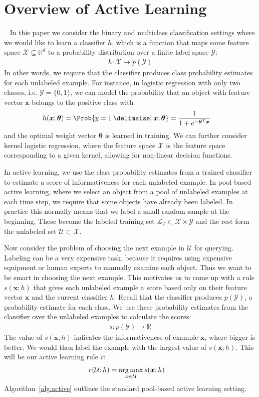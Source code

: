 \documentclass[fleqn,10pt,lineno]{wlpeerj} %
\newcommand{\X}{\mathcal{X}}
\newcommand{\Y}{\mathcal{Y}}
\newcommand{\Unlabeled}{\mathcal{U}}
\newcommand{\Labeled}{\mathcal{L}}
\newcommand*{\argmax}{\operatornamewithlimits{arg\,max}\limits}
\providecommand\given{}
\renewcommand\given{  \nonscript\:
		\delimsize\vert
		\nonscript\:
		\mathopen{}
		\allowbreak}
\renewcommand\given{  \nonscript\:
		\delimsize\vert
		\nonscript\:
		\mathopen{}
		\allowbreak}
\begin{document}
\section{Overview of Active Learning}~\label{sec:heuristics}
In this paper we consider the binary and multiclass classification settings
where we would like to learn a classifier $h$, which is a function that maps
some feature space $\X \subseteq \mathbb{R}^d$ to a probability distribution
over a finite label space $\Y$:
\begin{align}
	h : \X \rightarrow p(\Y)
\end{align}
In other words, we require that the classifier produces class probability
estimates for each unlabeled example. For instance, in logistic regression with
only two classes, i.e. $\Y = \{0, 1\}$, we can model the probability that an
object with feature vector $\bm{x}$ belongs to the positive class with
\begin{align}
	h(\bm{x}; \bm{\theta}) &= \Prob{y=1 \given \bm{x}; \bm{\theta}}
	= \dfrac{1}{1 + e^{-\bm{\theta}^T \bm{x}}}
\end{align}
and the optimal weight vector $\bm{\theta}$ is learned in training. We can
further consider kernel logistic regression, where the feature space $\X$ is
the feature space corresponding to a given kernel, allowing for non-linear
decision functions.

In active learning, we use the class probability estimates from a trained
classifier to estimate a score of informativeness for each unlabeled example.
In pool-based active learning, where we select an object from a pool of
unlabeled examples at each time step, we require that some objects have already
been labeled. In practice this normally means that we label a small random
sample at the beginning. These become the labeled training set $\Labeled_T
\subset \X \times \Y$ and the rest form the unlabeled set $\Unlabeled \subset
\X$.

Now consider the problem of choosing the next example in $\Unlabeled$ for
querying. Labeling can be a very expensive task, because it requires using
expensive equipment or human experts to manually examine each object. Thus we
want to be smart in choosing the next example. This motivates us to come up
with a rule $s(\bm{x}; h)$ that gives each unlabeled example a score based only
on their feature vector $\bm{x}$ and the current classifier $h$. Recall that
the classifier produces $p(\Y)$, a probability estimate for each class. We use
these probability estimates from the classifier over the unlabeled examples to
calculate the scores:
\begin{align}
	s : p(\Y) \rightarrow \mathbb{R}
\end{align}
The value of $s(\bm{x}; h)$ indicates the informativeness of example $\bm{x}$,
where bigger is better. We would then label the example with the largest value
of $s(\bm{x}; h)$. This will be our active learning rule $r$:
\begin{align}
	r(\Unlabeled; h) &= \argmax_{\bm{x} \in \Unlabeled} s(\bm{x}; h)
\end{align}
Algorithm~\ref{alg:active} outlines the standard pool-based active learning
setting.
\end{document}
